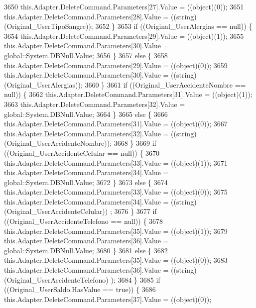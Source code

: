 \begin{DoxyCode}
3650                 this.Adapter.DeleteCommand.Parameters[27].Value = ((object)(0));
3651                 this.Adapter.DeleteCommand.Parameters[28].Value = ((string)(Original\_UserTipoSangre));
3652             \}
3653             \textcolor{keywordflow}{if} ((Original\_UserAlergias == null)) \{
3654                 this.Adapter.DeleteCommand.Parameters[29].Value = ((object)(1));
3655                 this.Adapter.DeleteCommand.Parameters[30].Value = global::System.DBNull.Value;
3656             \}
3657             \textcolor{keywordflow}{else} \{
3658                 this.Adapter.DeleteCommand.Parameters[29].Value = ((object)(0));
3659                 this.Adapter.DeleteCommand.Parameters[30].Value = ((string)(Original\_UserAlergias));
3660             \}
3661             \textcolor{keywordflow}{if} ((Original\_UserAccidenteNombre == null)) \{
3662                 this.Adapter.DeleteCommand.Parameters[31].Value = ((object)(1));
3663                 this.Adapter.DeleteCommand.Parameters[32].Value = global::System.DBNull.Value;
3664             \}
3665             \textcolor{keywordflow}{else} \{
3666                 this.Adapter.DeleteCommand.Parameters[31].Value = ((object)(0));
3667                 this.Adapter.DeleteCommand.Parameters[32].Value = ((string)(Original\_UserAccidenteNombre));
3668             \}
3669             \textcolor{keywordflow}{if} ((Original\_UserAccidenteCelular == null)) \{
3670                 this.Adapter.DeleteCommand.Parameters[33].Value = ((object)(1));
3671                 this.Adapter.DeleteCommand.Parameters[34].Value = global::System.DBNull.Value;
3672             \}
3673             \textcolor{keywordflow}{else} \{
3674                 this.Adapter.DeleteCommand.Parameters[33].Value = ((object)(0));
3675                 this.Adapter.DeleteCommand.Parameters[34].Value = ((string)(Original\_UserAccidenteCelular))
      ;
3676             \}
3677             \textcolor{keywordflow}{if} ((Original\_UserAccidenteTelefono == null)) \{
3678                 this.Adapter.DeleteCommand.Parameters[35].Value = ((object)(1));
3679                 this.Adapter.DeleteCommand.Parameters[36].Value = global::System.DBNull.Value;
3680             \}
3681             \textcolor{keywordflow}{else} \{
3682                 this.Adapter.DeleteCommand.Parameters[35].Value = ((object)(0));
3683                 this.Adapter.DeleteCommand.Parameters[36].Value = ((string)(Original\_UserAccidenteTelefono)
      );
3684             \}
3685             \textcolor{keywordflow}{if} ((Original\_UserSaldo.HasValue == \textcolor{keyword}{true})) \{
3686                 this.Adapter.DeleteCommand.Parameters[37].Value = ((object)(0));

\end{DoxyCode}
